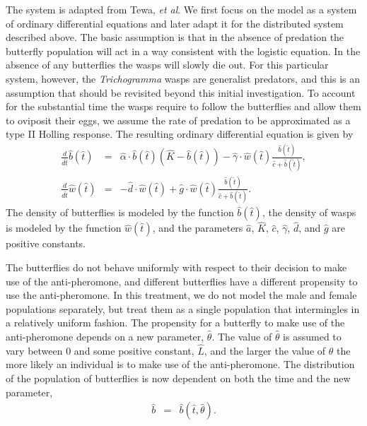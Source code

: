\documentclass[12pt]{article}
\newcommand{\origB}{\hat{b}}
\newcommand{\origW}{\hat{w}}
\newcommand{\origAlpha}{\hat{\alpha}}
\newcommand{\origK}{\hat{K}}
\newcommand{\origGamma}{\hat{\gamma}}
\newcommand{\origA}{\hat{a}}
\newcommand{\origC}{\hat{c}}
\newcommand{\origD}{\hat{d}}
\newcommand{\origG}{\hat{g}}
\newcommand{\origL}{\hat{L}}
\newcommand{\origTheta}{\hat{\theta}}
\newcommand{\origT}{\hat{t}}
\begin{document}
The system is adapted from Tewa, \textit{et al}\cite{TEWA20134825}. We
first focus on the model as a system of ordinary differential
equations and later adapt it for the distributed system described
above. The basic assumption is that in the absence of predation the
butterfly population will act in a way consistent with the logistic
equation. In the absence of any butterflies the wasps will slowly die
out. For this particular system, however, the \textit{Trichogramma}
wasps are generalist predators, and this is an assumption that should
be revisited beyond this initial investigation.  To account for the
substantial time the wasps require to follow the butterflies and allow
them to oviposit their eggs, we assume the rate of predation to be
approximated as a type II Holling response\cite{TEWA20134825}.  The
resulting ordinary differential equation is given by
\begin{eqnarray}
  \label{eq:initialSystem1}
  \frac{d}{d\origT} \origB(\origT) & = & \origAlpha \cdot \origB(\origT) (\origK - \origB(\origT))
                               - \origGamma \cdot \origW(\origT) \frac{\origB(\origT)}{\origC+\origB(\origT)}, \\
  \label{eq:initialSystem2}
  \frac{d}{d\origT} \origW(\origT) & = & -\origD \cdot \origW(\origT) + \origG \cdot \origW(\origT) \frac{\origB(\origT)}{\origC+\origB(\origT)}.
\end{eqnarray}
The density of butterflies is modeled by the function
$\origB(\origT)$, the density of wasps is modeled by the function
$\origW(\origT)$, and the parameters $\origA$, $\origK$, $\origC$,
$\origGamma$, $\origD$, and $\origG$ are positive constants.

The butterflies do not behave uniformly with respect to their decision
to make use of the anti-pheromone, and different butterflies have a
different propensity to use the anti-pheromone. In this treatment, we
do not model the male and female populations separately, but treat
them as a single population that intermingles in a relatively uniform
fashion. The propensity for a butterfly to make use of the
anti-pheromone depends on a new parameter, $\origTheta$. The value of
$\origTheta$ is assumed to vary between $0$ and some positive constant,
$\origL$, and the larger the value of $\origTheta$ the more likely an
individual is to make use of the anti-pheromone. The distribution of
the population of butterflies is now dependent on both the time and
the new parameter,
\begin{eqnarray}
  \origB & = & \origB(\origT,\origTheta).
\end{eqnarray}
\end{document}
